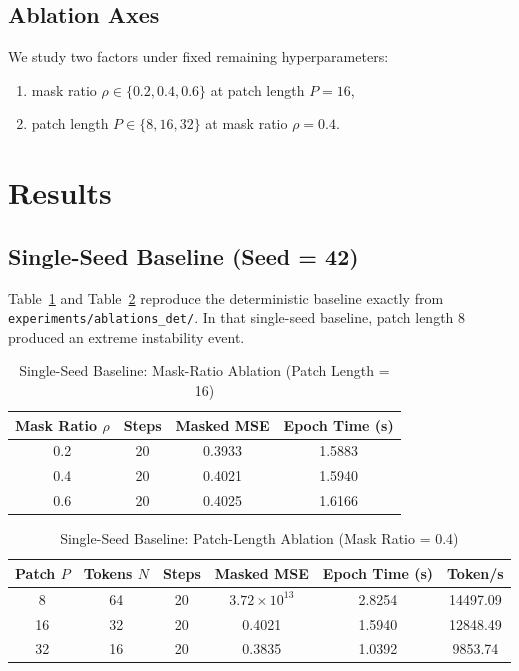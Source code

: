 \documentclass[conference]{IEEEtran}
\begin{document}
\subsection{Ablation Axes}
We study two factors under fixed remaining hyperparameters:
\begin{enumerate}
    \item mask ratio $\rho \in \{0.2, 0.4, 0.6\}$ at patch length $P=16$,
    \item patch length $P \in \{8, 16, 32\}$ at mask ratio $\rho=0.4$.
\end{enumerate}

\section{Results}
\subsection{Single-Seed Baseline (Seed = 42)}
Table~\ref{tab:mask_ablation} and Table~\ref{tab:patch_ablation} reproduce the deterministic baseline exactly from \texttt{experiments/ablations\_det/}. In that single-seed baseline, patch length 8 produced an extreme instability event.

\begin{table}[t]
\caption{Single-Seed Baseline: Mask-Ratio Ablation (Patch Length = 16)}
\label{tab:mask_ablation}
\centering
\begin{tabular}{cccc}
\toprule
Mask Ratio $\rho$ & Steps & Masked MSE & Epoch Time (s) \\
\midrule
0.2 & 20 & 0.3933 & 1.5883 \\
0.4 & 20 & 0.4021 & 1.5940 \\
0.6 & 20 & 0.4025 & 1.6166 \\
\bottomrule
\end{tabular}
\end{table}

\begin{table}[t]
\caption{Single-Seed Baseline: Patch-Length Ablation (Mask Ratio = 0.4)}
\label{tab:patch_ablation}
\centering
\begin{tabular}{cccccc}
\toprule
Patch $P$ & Tokens $N$ & Steps & Masked MSE & Epoch Time (s) & Token/s \\
\midrule
8  & 64 & 20 & $3.72\times10^{13}$ & 2.8254 & 14497.09 \\
16 & 32 & 20 & 0.4021 & 1.5940 & 12848.49 \\
32 & 16 & 20 & 0.3835 & 1.0392 & 9853.74 \\
\bottomrule
\end{tabular}
\end{table}
\end{document}
